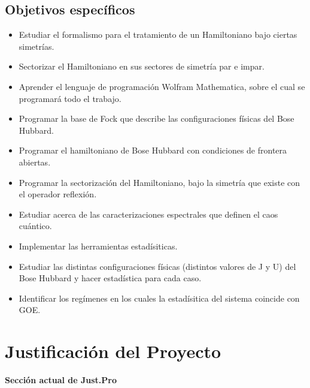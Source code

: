 \documentclass[spanish,titlepage,table]{practicas}
\begin{document}
\subsection{Objetivos específicos}
\begin{itemize}
\item Estudiar el formalismo para el tratamiento de un Hamiltoniano bajo ciertas simetrías.
\item Sectorizar el Hamiltoniano en sus sectores de simetría par e impar.
\item Aprender el lenguaje de programación Wolfram Mathematica, sobre el cual se programará todo el trabajo.
\item Programar la base de Fock que describe las configuraciones físicas del Bose Hubbard.
\item Programar el hamiltoniano de Bose Hubbard con condiciones de frontera abiertas.
\item Programar la sectorización del Hamiltoniano, bajo la simetría que existe con el operador reflexión.
\item Estudiar acerca de las caracterizaciones espectrales que definen el caos cuántico. 
\item Implementar las herramientas estadísiticas.
\item Estudiar las distintas configuraciones físicas (distintos valores de J y U) del Bose Hubbard y hacer estadística para cada caso.
\item Identificar los regímenes en los cuales la estadísitica del sistema coincide con GOE.
\end{itemize}
\section{Justificación del Proyecto}
\textbf{Sección actual de Just.Pro}
\end{document}
